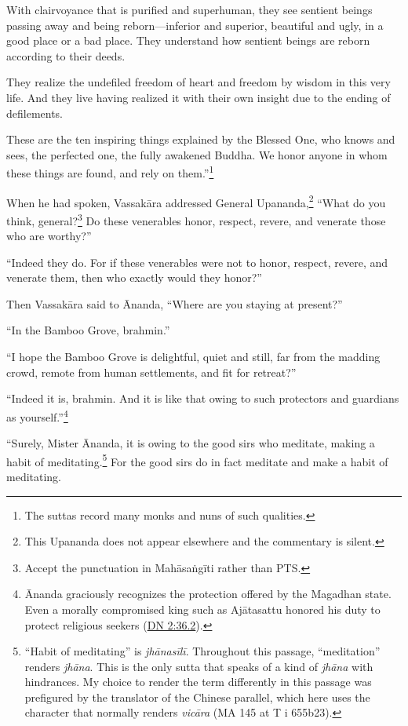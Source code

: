 \documentclass[12pt,openany]{book}%
\begin{document}
With clairvoyance that is purified and superhuman, they see sentient beings passing away and being reborn—inferior and superior, beautiful and ugly, in a good place or a bad place. They understand how sentient beings are reborn according to their deeds. 

They realize the undefiled freedom of heart and freedom by wisdom in this very life. And they live having realized it with their own insight due to the ending of defilements. 

These are the ten inspiring things explained by the Blessed One, who knows and sees, the perfected one, the fully awakened Buddha. We honor anyone in whom these things are found, and rely on them.”\footnote{The suttas record many monks and nuns of such qualities. } 

When he had spoken, \textsanskrit{Vassakāra} addressed General Upananda,\footnote{This Upananda does not appear elsewhere and the commentary is silent. } “What do you think, general?\footnote{Accept the punctuation in \textsanskrit{Mahāsaṅgīti} rather than PTS. } Do these venerables honor, respect, revere, and venerate those who are worthy?” 

“Indeed they do. For if these venerables were not to honor, respect, revere, and venerate them, then who exactly would they honor?” 

Then \textsanskrit{Vassakāra} said to Ānanda, “Where are you staying at present?” 

“In the Bamboo Grove, brahmin.” 

“I hope the Bamboo Grove is delightful, quiet and still, far from the madding crowd, remote from human settlements, and fit for retreat?” 

“Indeed it is, brahmin. And it is like that owing to such protectors and guardians as yourself.”\footnote{Ānanda graciously recognizes the protection offered by the Magadhan state. Even a morally compromised king such as \textsanskrit{Ajātasattu} honored his duty to protect religious seekers (\href{https://suttacentral.net/dn2/en/sujato\#36.2}{DN 2:36.2}). } 

“Surely, Mister Ānanda, it is owing to the good sirs who meditate, making a habit of meditating.\footnote{“Habit of meditating” is \textit{\textsanskrit{jhānasīlī}}. Throughout this passage, “meditation” renders \textit{\textsanskrit{jhāna}}. This is the only sutta that speaks of a kind of \textit{\textsanskrit{jhāna}} with hindrances. My choice to render the term differently in this passage was prefigured by the translator of the Chinese parallel, which here uses the character that normally renders \textit{\textsanskrit{vicāra}} (MA 145 at T i 655b23). } For the good sirs do in fact meditate and make a habit of meditating. 
\end{document}
